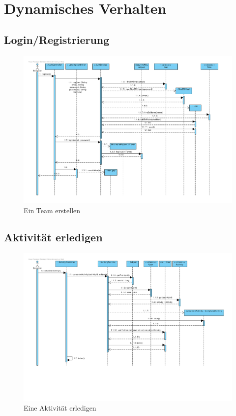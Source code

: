 ﻿\section{Dynamisches Verhalten}

\subsection{Login/Registrierung}

\begin{figure}[H]
  \centering
  \includegraphics[width=\textwidth, clip]{gfx/registrieren}
  \caption{Ein Team erstellen}
\end{figure}


\subsection{Aktivität erledigen}

\begin{figure}[H]
  \centering
  \includegraphics[width=\textwidth, clip]{gfx/aktivitaet_erledigen}
  \caption{Eine Aktivität erledigen}
\end{figure}

